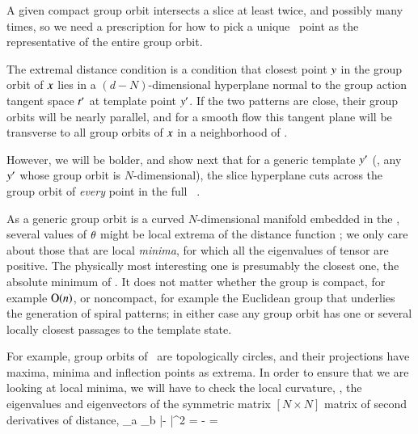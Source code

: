 A given compact group orbit intersects a slice at least twice, and
possibly many times, so we need a prescription for how to
pick a unique \reducedsp\ point as the representative of the entire group
orbit.

The extremal distance condition  is a condition that
closest point $y$ in the group orbit of $x$ lies in a
$(d\!-\!N)$-dimensional hyperplane normal to the group action tangent
space $t'_{}$ at template point ${y'}$. If the two patterns are
close, their group orbits will be nearly parallel, and for a smooth flow
this tangent plane will be transverse to all group orbits of $x$ in a
neighborhood of \slicep.

However, we will be bolder, and show next that for a generic template ${y'}$ (\ie, any ${y'}$ whose group orbit is $N$-dimensional), the slice hyperplane  cuts across the group orbit of {\em every} point in the full \statesp\ \pS.


As a generic group orbit is a curved $N$-dimensional manifold embedded in
the \statesp, several values of ${\bf \theta}$ might be local extrema of the
distance function ; we only care about those that are
local {\em minima}, for which all the eigenvalues of tensor
 are positive. The physically most interesting one is
presumably the closest one, the absolute minimum of .
It does not matter whether the group is compact, for example $\textrm{O}(n)$, or
noncompact, for example the Euclidean group that underlies the generation
of spiral patterns; in either case any group orbit has
one or several locally closest passages to the template state.

For
example, group orbits of \ are topologically circles, and their
projections have maxima, minima and inflection points as extrema.
In order to ensure that we are looking at local minima, we will have to
check the local curvature, \ie, the eigenvalues and eigenvectors of the
symmetric matrix $[N\!\times\!N]$ matrix of second derivatives
of distance,
\beq
{}
     {\partial \gSpace_a \partial \gSpace_b}
        |\sspRed - \slicep|^2
    =
  - =


